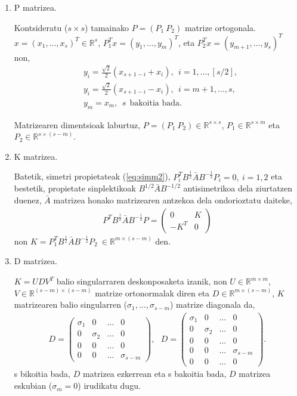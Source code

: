 \begin{enumerate}
\item P matrizea.

Kontsideratu ($s \times s$) tamainako $P=(P_1 \ P_2)$ matrize ortogonala. $x=(x_1,\dots,x_s)^T \in \mathbb{R}^s$, $P_1^Tx=(y_1,\dots,y_m)^T$, eta $P_2^Tx=(y_{m+1},\dots,y_s)^T$ non,
\begin{align*}
&y_i = \frac{\sqrt{2}}{2} (x_{s+1-i}+x_i), \ \ i=1,\dots,[s/2], \\
&y_i =\frac{\sqrt{2}}{2} (x_{s+1-i}-x_{i}), \ \ i=m+1,\dots,s, \\
&y_{m} = x_{m}, \ \ s \ \ \mbox{bakoitia bada}.
\end{align*}  

Matrizearen dimentsioak laburtuz, $P=(P_1 \ P_2) \in \mathbb{R}^{s \times s}$, $P_1 \in \mathbb{R}^{s \times m}$ eta $P_2 \in \mathbb{R}^{s \times (s-m)}$.

\item K matrizea.

Batetik, simetri propietateak (\ref{eq:simm2}),  $P_i^TB^{\frac{1}{2}}\bar{A}B^{-\frac{1}{2}}P_i=0, \ i=1,2$  eta bestetik, propietate sinplektikoak $B^{1/2}\bar{A}B^{-1/2}$ antisimetrikoa dela ziurtatzen duenez, $\bar{A}$ matrizea honako matrizearen antzekoa dela ondorioztatu daiteke,
\begin{align}
P^TB^{\frac{1}{2}}\bar{A}B^{-\frac{1}{2}}P=
\left(
\begin{matrix}
0 & K \\
-K^T & 0
\end{matrix}
\right)
\end{align}
non $K=P_1^TB^{\frac{1}{2}}\bar{A}B^{-\frac{1}{2}}P_2 \ \in \mathbb{R}^{m \times (s-m)}$ den.

\item D matrizea.

$K=UDV^T$ balio singularraren deskonposaketa izanik, non $U \in \mathbb{R}^{m \times m}$, $V \in \mathbb{R}^{(s-m) \times (s-m)}$ matrize ortonormalak diren eta $D \in \mathbb{R}^{m \times (s-m)}$, $K$ matrizearen balio singularren ($\sigma_1, \dots, \sigma_{s-m}$) matrize diagonala da,
\begin{align}
\label{eq:Dmat}
D=
\left(
\begin{matrix}
\sigma_1 & 0 & \dots & 0 \\
0 & \sigma_2 & \dots & 0 \\
0 & 0 & \dots & 0 \\
0 & 0 & \dots & \sigma_{s-m}
\end{matrix}
\right), \ \ \
D=
\left(
\begin{matrix}
\sigma_1 & 0 & \dots & 0 \\
0 & \sigma_2 & \dots & 0 \\
0 & 0 & \dots & 0 \\
0 & 0 & \dots & \sigma_{s-m} \\
0 & 0 & \dots & 0
\end{matrix}
\right).
\end{align}
s bikoitia bada, $D$ matrizea ezkerrean eta s bakoitia bada, $D$ matrizea eskubian ($\sigma_m=0$) irudikatu dugu. 


\end{enumerate}
